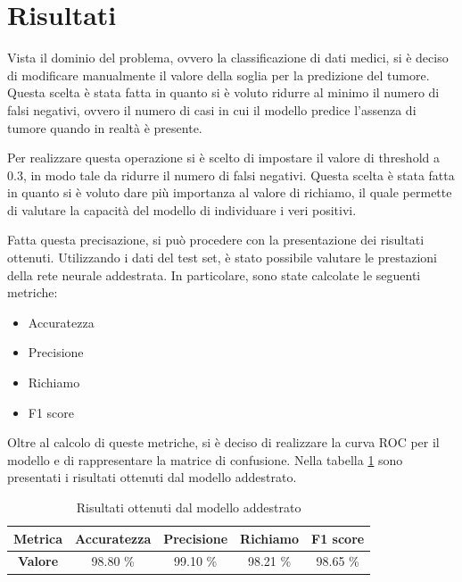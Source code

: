 \section{Risultati}
Vista il dominio del problema, ovvero la classificazione di dati medici, si è
deciso di modificare manualmente il valore della soglia per la predizione
del tumore. Questa scelta è stata fatta in quanto si è voluto ridurre al minimo
il numero di falsi negativi, ovvero il numero di casi in cui il modello predice
l'assenza di tumore quando in realtà è presente.

Per realizzare questa operazione si è scelto di impostare il valore di threshold
a $0.3$, in modo tale da ridurre il numero di falsi negativi. Questa scelta è
stata fatta in quanto si è voluto dare più importanza al valore di richiamo, il
quale permette di valutare la capacità del modello di individuare i veri positivi.

Fatta questa precisazione, si può procedere con la presentazione dei risultati
ottenuti. Utilizzando i dati del test set, è stato possibile valutare le
prestazioni della rete neurale addestrata. In particolare, sono state calcolate
le seguenti metriche:
\begin{itemize}
    \item Accuratezza
    \item Precisione
    \item Richiamo
    \item F1 score
\end{itemize}
Oltre al calcolo di queste metriche, si è deciso di realizzare la curva ROC per
il modello e di rappresentare la matrice di confusione. Nella tabella
\ref{tab:risultatiReteNeurale} sono presentati i risultati ottenuti dal modello
addestrato.
\begin{table}[!ht]
    \centering
    \begin{tabular}{@{}cllll@{}}
        \toprule
        \rowcolor[HTML]{EFEFEF}
        \textbf{Metrica}                        & \textbf{Accuratezza}         & \textbf{Precisione}          & \textbf{Richiamo}            & \textbf{F1 score}            \\ \midrule
        \cellcolor[HTML]{EFEFEF}\textbf{Valore} & \multicolumn{1}{c}{98.80 \%} & \multicolumn{1}{c}{99.10 \%} & \multicolumn{1}{c}{98.21 \%} & \multicolumn{1}{c}{98.65 \%} \\ \bottomrule
    \end{tabular}
    \caption{Risultati ottenuti dal modello addestrato}
    \label{tab:risultatiReteNeurale}
\end{table}

